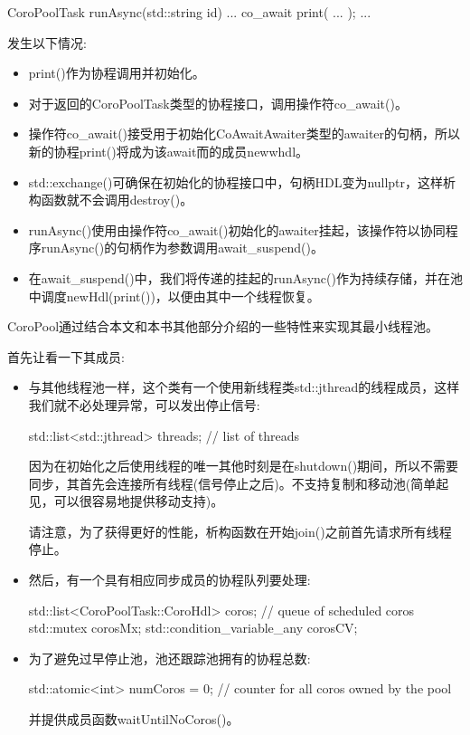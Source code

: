 \begin{cpp}
CoroPoolTask runAsync(std::string id)
{
	...
	co_await print( ... );
	...
}
\end{cpp}

发生以下情况:

\begin{itemize}
\item
print()作为协程调用并初始化。

\item 
对于返回的CoroPoolTask类型的协程接口，调用操作符co\_await()。

\item 
操作符co\_await()接受用于初始化CoAwaitAwaiter类型的awaiter的句柄，所以新的协程print()将成为该await而的成员newwhdl。

\item 
std::exchange()可确保在初始化的协程接口中，句柄HDL变为nullptr，这样析构函数就不会调用destroy()。

\item 
runAsync()使用由操作符co\_await()初始化的awaiter挂起，该操作符以协同程序runAsync()的句柄作为参数调用await\_suspend()。

\item 
在await\_suspend()中，我们将传递的挂起的runAsync()作为持续存储，并在池中调度newHdl(print())，以便由其中一个线程恢复。
\end{itemize}


CoroPool通过结合本文和本书其他部分介绍的一些特性来实现其最小线程池。

首先让看一下其成员:

\begin{itemize}
\item 
与其他线程池一样，这个类有一个使用新线程类std::jthread的线程成员，这样我们就不必处理异常，可以发出停止信号:

\begin{cpp}
std::list<std::jthread> threads; // list of threads
\end{cpp}

因为在初始化之后使用线程的唯一其他时刻是在shutdown()期间，所以不需要同步，其首先会连接所有线程(信号停止之后)。不支持复制和移动池(简单起见，可以很容易地提供移动支持)。

请注意，为了获得更好的性能，析构函数在开始join()之前首先请求所有线程停止。

\item 
然后，有一个具有相应同步成员的协程队列要处理:

\begin{cpp}
std::list<CoroPoolTask::CoroHdl> coros; // queue of scheduled coros
std::mutex corosMx;
std::condition_variable_any corosCV;
\end{cpp}

\item 
为了避免过早停止池，池还跟踪池拥有的协程总数:

\begin{cpp}
std::atomic<int> numCoros = 0; // counter for all coros owned by the pool
\end{cpp}

并提供成员函数waitUntilNoCoros()。
\end{itemize}

